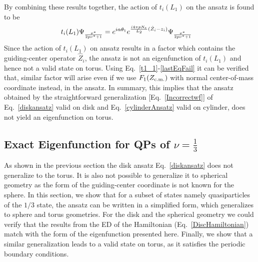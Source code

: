 \documentclass[prb,aps,epsfig,longbibliography,twocolumn]{revtex4-1}
\newcommand{\iiota}{\dot{\iota}}
\begin{document}
By combining these results together, the action of $t_i(L_1)$ on the ansatz is found to be
\begin{align}
t_i(L_1)\Psi_{\frac{\nu^*}{2p\nu^*+1}}&=e^{i\alpha\theta_1}e^{{\iiota 4\pi pN_e\over L_2}(\hat{Z}_i-z_i)}\Psi_{\frac{\nu^*}{2p\nu^*+1}}\label{pb2}
\end{align}
Since the action of $t_i(L_1)$ on ansatz results in a factor which contains the guiding-center operator $\hat{Z}_i$, the ansatz is not an eigenfunction of $t_i(L_1)$ and hence not a valid state on torus. Using Eq.~\eqref{t1_1}-\eqref{lastEqFail} it can be verified that, similar factor will arise even if we use $F_1({Z}_{\rm c.m.})$ with normal center-of-mass coordinate instead, in the ansatz. In summary, this implies that the ansatz obtained by the straightforward generalization [Eq.~\eqref{Incorrectwf}] of Eq.~\eqref{diskansatz} valid on disk and Eq.~\eqref{cylinderAnsatz} valid on cylinder, does not yield an eigenfunction on torus.

\subsection{Exact Eigenfunction for QPs of $\nu= \frac{1}{3}$}\label{correctAnsatz}
As shown in the previous section the disk ansatz Eq.~\eqref{diskansatz} does not generalize to the torus. It is also not possible to generalize it to spherical geometry as the form of the guiding-center coordinate is not known for the sphere. 
%
In this section, we show that for a subset of states namely quasiparticles of the $1/3$ state, the ansatz can be written in a simplified form, which generalizes to sphere and torus geometries. For the disk and the spherical geometry we could verify that the results from the ED of the Hamiltonian (Eq.~\eqref{DiscHamiltonian}) match with the form of the eigenfunction presented here. Finally, we show that a similar generalization leads to a valid state on torus, as it satisfies the periodic boundary conditions.
\end{document}
